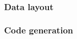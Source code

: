 \begin{frame}
  \frametitle{Data layout}

\end{frame}

\begin{frame}
  \frametitle{Code generation}

\end{frame}

